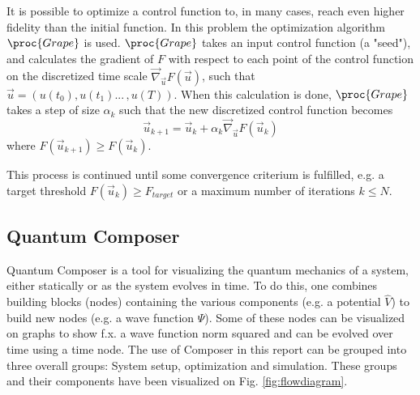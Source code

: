\documentclass[aps,pra,reprint,superscriptaddress]{revtex4-1}
\begin{document}
It is possible to optimize a control function to, in many cases, reach even higher fidelity than the initial function. In this problem the optimization algorithm $\proc{Grape}$ is used. $\proc{Grape}$ takes an input control function (a "seed"), and calculates the gradient of $F$ with respect to each point of the control function on the discretized time scale $\vec{\nabla}_{\vec{u}}F(\vec{u})$, such that $\vec{u} = (u(t_0), u(t_1) ... \,, u(T))$. When this calculation is done, $\proc{Grape}$ takes a step of size $\alpha_k$ such that the new discretized control function becomes
\begin{equation}
	\vec{u}_{k+1} = \vec{u}_{k} + \alpha_k \vec{\nabla}_{\vec{u}}F(\vec{u}_k)
\end{equation}
where $F(\vec{u}_{k+1}) \geq F(\vec{u}_{k})$.

This process is continued until some convergence criterium is fulfilled, e.g. a target threshold $F(\vec{u}_{k}) \geq F_{target}$ or a maximum number of iterations $k \leq N$.

\subsection{Quantum Composer}
Quantum Composer is a tool for visualizing the quantum mechanics of a system, either statically or as the system evolves in time. To do this, one combines building blocks (nodes) containing the various components (e.g. a potential $\hat{V}$) to build new nodes (e.g. a wave function $\Psi$). Some of these nodes can be visualized on graphs to show f.x. a wave function norm squared and can be evolved over time using a time node. The use of Composer in this report can be grouped into three overall groups: System setup,  optimization and simulation. These groups and their components have been visualized on Fig. \ref{fig:flowdiagram}. 
\end{document}
